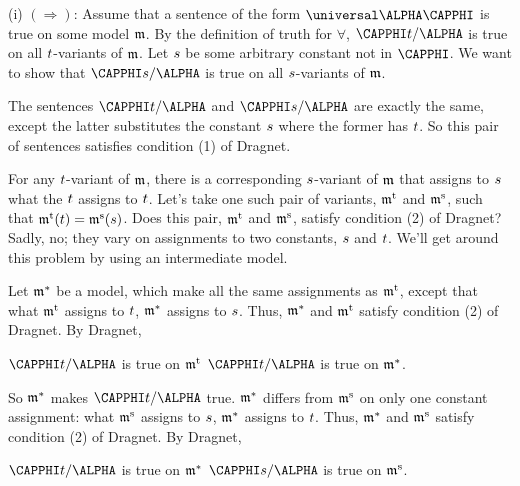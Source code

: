 \begin{PROOF}
(i) $(\Rightarrow)$: Assume that a \GQL{} sentence of the form $\universal\ALPHA\CAPPHI$ is true on some model $\mathfrak{m}$.  By the definition of truth for $\forall$, $\CAPPHI\variable{t}/\ALPHA$ is true on all $t$-variants of $\mathfrak{m}$.  Let $s$ be some arbitrary constant not in $\CAPPHI$.  We want to show that $\CAPPHI\variable{s}/\ALPHA$ is true on all $s$-variants of $\mathfrak{m}$.

The sentences $\CAPPHI\variable{t}/\ALPHA$ and $\CAPPHI\variable{s}/\ALPHA$ are exactly the same, except the latter substitutes the constant $s$ where the former has $t$.  So this pair of sentences satisfies condition (1) of Dragnet.

For any $t$-variant of $\mathfrak{m}$, there is a corresponding $s$-variant of $\mathfrak{m}$ that assigns to $s$ what the $t$ assigns to $t$.  Let's take one such pair of variants, $\mathfrak{m^{\mathrm{t}}_{\mathrm{}}}$ and $\mathfrak{m^{\mathrm{s}}_{\mathrm{}}}$, such that $\mathfrak{m^{\mathrm{t}}_{\mathrm{}}}(t)=\mathfrak{m^{\mathrm{s}}_{\mathrm{}}}(s)$.  Does this pair, $\mathfrak{m^{\mathrm{t}}_{\mathrm{}}}$ and $\mathfrak{m^{\mathrm{s}}_{\mathrm{}}}$, satisfy condition (2) of Dragnet?  Sadly, no; they vary on assignments to two constants, $s$ and $t$.  We'll get around this problem by using an intermediate model.

Let $\mathfrak{m}^*$ be a  model, which make all the same assignments as $\mathfrak{m^{\mathrm{t}}_{\mathrm{}}}$, except that what $\mathfrak{m^{\mathrm{t}}_{\mathrm{}}}$ assigns to $t$, $\mathfrak{m}^*$ assigns to $s$.  Thus, $\mathfrak{m}^*$ and $\mathfrak{m^{\mathrm{t}}_{\mathrm{}}}$ satisfy condition (2) of Dragnet.  By Dragnet,

\begin{center}
$\CAPPHI\variable{t}/\ALPHA$ is true on $\mathfrak{m^{\mathrm{t}}_{\mathrm{}}}$ \Iff $\CAPPHI\variable{t}/\ALPHA$ is true on $\mathfrak{m}^*$.
\end{center}

So $\mathfrak{m}^*$ makes $\CAPPHI\variable{t}/\ALPHA$ true.  $\mathfrak{m}^*$ differs from $\mathfrak{m^{\mathrm{s}}_{\mathrm{}}}$ on only one constant assignment: what $\mathfrak{m^{\mathrm{s}}_{\mathrm{}}}$ assigns to $s$, $\mathfrak{m}^*$ assigns to $t$.  Thus, $\mathfrak{m}^*$ and $\mathfrak{m^{\mathrm{s}}_{\mathrm{}}}$ satisfy condition (2) of Dragnet.  By Dragnet,

\begin{center}
	$\CAPPHI\variable{t}/\ALPHA$ is true on $\mathfrak{m}^*$ \Iff $\CAPPHI\variable{s}/\ALPHA$ is true on $\mathfrak{m^{\mathrm{s}}_{\mathrm{}}}$.
\end{center}


\end{PROOF}
